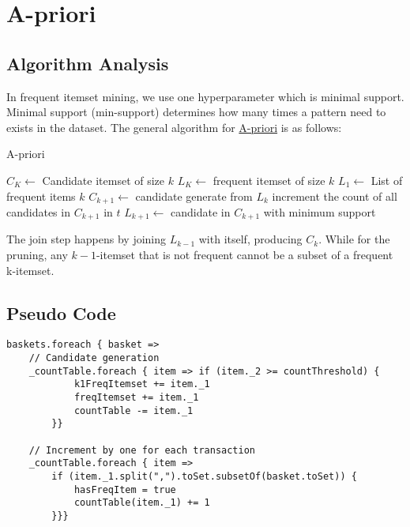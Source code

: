 \documentclass[11pt]{article}
\begin{document}
\section{A-priori}

\subsection {Algorithm Analysis}

In frequent itemset mining, we use one hyperparameter which is minimal support.
Minimal support (min-support) determines how many times a pattern need to exists in the dataset.
The general algorithm for \href{https://www3.cs.stonybrook.edu/~cse634/lecture_notes/07apriori.pdf}{A-priori} is as follows:

\begin{algorithm}[H]
    \caption{A-priori}

    \begin{algorithmic}[1]
        \State $C_K \gets $ Candidate itemset of size $k$
        \State $L_K \gets $ frequent itemset of size $k$
        \State
        \State $L_1 \gets $ List of frequent items $k$
        \State
            \State $C_{k+1} \gets $ candidate generate from $L_k$
                \State increment the count of all candidates in $C_{k+1}$ in $t$
            \EndFor
            \State $L_{k+1} \gets$ candidate in $C_{k+1}$ with minimum support
        \EndFor
    \end{algorithmic}
\end{algorithm}

The join step happens by joining $L_{k-1}$ with itself, producing $C_k$.
While for the pruning, any $k-1$-itemset that is not frequent cannot be a subset of a frequent k-itemset.


\subsection {Pseudo Code}
\begin{lstlisting}
baskets.foreach { basket =>
    // Candidate generation
    _countTable.foreach { item => if (item._2 >= countThreshold) {
            k1FreqItemset += item._1
            freqItemset += item._1
            countTable -= item._1
        }}

    // Increment by one for each transaction
    _countTable.foreach { item =>
        if (item._1.split(",").toSet.subsetOf(basket.toSet)) {
            hasFreqItem = true
            countTable(item._1) += 1
        }}}
\end{lstlisting}
\end{document}

